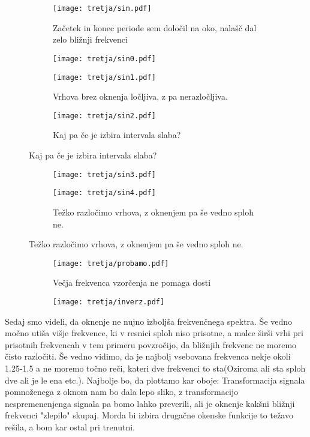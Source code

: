 \documentclass{article}
\begin{document}
\begin{figure}[H]
\begin{subfigure}{.5\textwidth}
\texttt{[image: tretja/sin.pdf]}
\caption*{Začetek in konec periode sem določil na oko, nalašč dal zelo bližnji frekvenci}
\end{subfigure}
\begin{subfigure}{.5\textwidth}
\texttt{[image: tretja/sin0.pdf]}
\end{subfigure}
\end{figure}
\begin{figure}[H]
\begin{subfigure}{.5\textwidth}
\texttt{[image: tretja/sin1.pdf]}
\caption*{Vrhova brez oknenja ločljiva, z pa nerazločljiva.}
\end{subfigure}
\begin{subfigure}{.5\textwidth}
\texttt{[image: tretja/sin2.pdf]}
\caption*{Kaj pa če je izbira intervala slaba?}
\end{subfigure}
\end{figure}
\begin{figure}[H]
\begin{subfigure}{.5\textwidth}
\texttt{[image: tretja/sin3.pdf]}
\end{subfigure}
\begin{subfigure}{.5\textwidth}
\texttt{[image: tretja/sin4.pdf]}
\caption*{Težko razločimo vrhova, z oknenjem pa še vedno sploh ne.}
\end{subfigure}
\end{figure}

\begin{figure}[H]
\begin{subfigure}{.5\textwidth}
\texttt{[image: tretja/probamo.pdf]}
\caption*{Večja frekvenca vzorčenja ne pomaga dosti}
\end{subfigure}
\begin{subfigure}{.5\textwidth}
\texttt{[image: tretja/inverz.pdf]}
\end{subfigure}
\end{figure}

Sedaj smo videli, da oknenje ne nujno izboljša frekvenčnega spektra. Še vedno močno utiša višje frekvence, ki v resnici sploh niso prisotne, a malce širši vrhi pri prisotnih frekvencah v tem primeru povzročijo,
da bližnjih frekvenc ne moremo čisto razločiti. Še vedno vidimo, da je najbolj vsebovana frekvenca nekje okoli 1.25-1.5 a ne moremo točno reči, kateri dve frekvenci to sta(Oziroma ali sta sploh dve ali je le ena etc.).
Najbolje bo, da plottamo kar oboje: Transformacija signala pomnoženega z oknom nam bo dala lepo sliko, z transformacijo nespremenenjenga signala pa bomo lahko preverili, ali je oknenje kakšni bližnji frekvenci "zlepilo" skupaj.
Morda bi izbira drugačne okenske funkcije to težavo rešila, a bom kar ostal pri trenutni.
\end{document}
